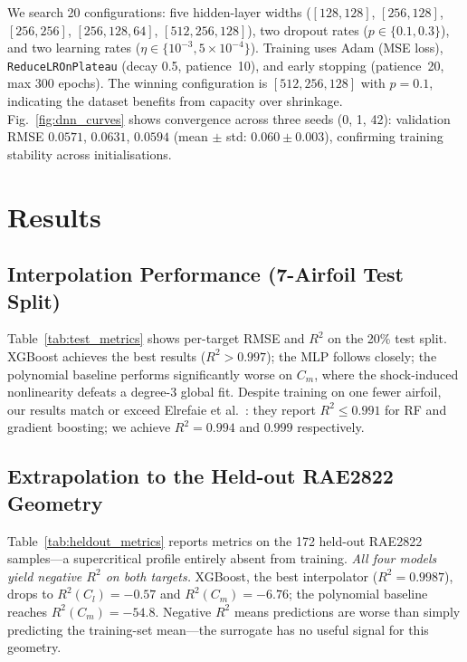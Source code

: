 \documentclass[11pt]{article}
\begin{document}
We search 20 configurations: five hidden-layer widths
($[128,128]$, $[256,128]$, $[256,256]$, $[256,128,64]$, $[512,256,128]$),
two dropout rates ($p \in \{0.1, 0.3\}$), and two learning rates
($\eta \in \{10^{-3}, 5\times10^{-4}\}$). Training uses Adam (MSE loss),
\texttt{ReduceLROnPlateau} (decay 0.5, patience~10), and early stopping
(patience~20, max 300 epochs). The winning configuration is $[512,256,128]$
with $p=0.1$, indicating the dataset benefits from capacity over shrinkage.
Fig.~\ref{fig:dnn_curves} shows convergence across three seeds (0, 1, 42):
validation RMSE $0.0571$, $0.0631$, $0.0594$ (mean $\pm$ std:
$0.060 \pm 0.003$), confirming training stability across initialisations.

\section{Results}

\subsection{Interpolation Performance (7-Airfoil Test Split)}

Table~\ref{tab:test_metrics} shows per-target RMSE and $R^2$ on the 20\%
test split. XGBoost achieves the best results ($R^2 > 0.997$); the MLP
follows closely; the polynomial baseline performs significantly worse on
$C_m$, where the shock-induced nonlinearity defeats a degree-3 global fit.
Despite training on one fewer airfoil, our results match or exceed
Elrefaie et al.\ \cite{elrefaie2024}: they report $R^2 \leq 0.991$ for RF
and gradient boosting; we achieve $R^2 = 0.994$ and $0.999$ respectively.

\begin{table}[h]
  \centering
  \caption{Interpolation test-split metrics ($N=238$, 7-airfoil pool)}
  \label{tab:test_metrics}
  
\end{table}

\subsection{Extrapolation to the Held-out RAE2822 Geometry}\label{sec:holdout}

Table~\ref{tab:heldout_metrics} reports metrics on the 172 held-out
RAE2822 samples---a supercritical profile entirely absent from training.
\emph{All four models yield negative $R^2$ on both targets.} XGBoost,
the best interpolator ($R^2=0.9987$), drops to $R^2(C_l)=-0.57$ and
$R^2(C_m)=-6.76$; the polynomial baseline reaches $R^2(C_m)=-54.8$.
Negative $R^2$ means predictions are worse than simply predicting the
training-set mean---the surrogate has no useful signal for this geometry.
\end{document}
